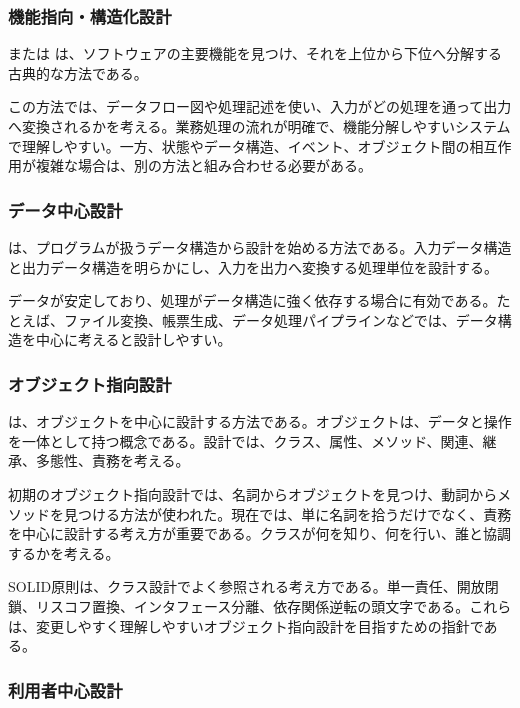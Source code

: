 \documentclass[a4paper,11pt]{ltjsarticle}
\numberwithin{figure}{section}
\numberwithin{table}{section}
\begin{document}
\subsubsection{機能指向・構造化設計}

 または は、ソフトウェアの主要機能を見つけ、それを上位から下位へ分解する古典的な方法である。

この方法では、データフロー図や処理記述を使い、入力がどの処理を通って出力へ変換されるかを考える。業務処理の流れが明確で、機能分解しやすいシステムで理解しやすい。一方、状態やデータ構造、イベント、オブジェクト間の相互作用が複雑な場合は、別の方法と組み合わせる必要がある。

\subsubsection{データ中心設計}

 は、プログラムが扱うデータ構造から設計を始める方法である。入力データ構造と出力データ構造を明らかにし、入力を出力へ変換する処理単位を設計する。

データが安定しており、処理がデータ構造に強く依存する場合に有効である。たとえば、ファイル変換、帳票生成、データ処理パイプラインなどでは、データ構造を中心に考えると設計しやすい。

\subsubsection{オブジェクト指向設計}

 は、オブジェクトを中心に設計する方法である。オブジェクトは、データと操作を一体として持つ概念である。設計では、クラス、属性、メソッド、関連、継承、多態性、責務を考える。

初期のオブジェクト指向設計では、名詞からオブジェクトを見つけ、動詞からメソッドを見つける方法が使われた。現在では、単に名詞を拾うだけでなく、責務を中心に設計する考え方が重要である。クラスが何を知り、何を行い、誰と協調するかを考える。

SOLID原則は、クラス設計でよく参照される考え方である。単一責任、開放閉鎖、リスコフ置換、インタフェース分離、依存関係逆転の頭文字である。これらは、変更しやすく理解しやすいオブジェクト指向設計を目指すための指針である。

\subsubsection{利用者中心設計}
\end{document}
